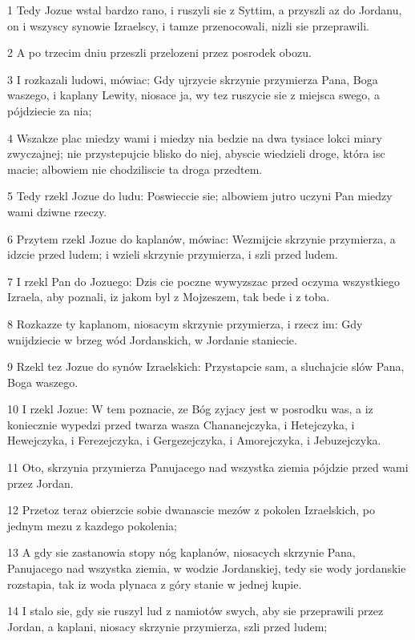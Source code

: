 \par 1 Tedy Jozue wstal bardzo rano, i ruszyli sie z Syttim, a przyszli az do Jordanu, on i wszyscy synowie Izraelscy, i tamze przenocowali, nizli sie przeprawili.
\par 2 A po trzecim dniu przeszli przelozeni przez posrodek obozu.
\par 3 I rozkazali ludowi, mówiac: Gdy ujrzycie skrzynie przymierza Pana, Boga waszego, i kaplany Lewity, niosace ja, wy tez ruszycie sie z miejsca swego, a pójdziecie za nia;
\par 4 Wszakze plac miedzy wami i miedzy nia bedzie na dwa tysiace lokci miary zwyczajnej; nie przystepujcie blisko do niej, abyscie wiedzieli droge, która isc macie; albowiem nie chodziliscie ta droga przedtem.
\par 5 Tedy rzekl Jozue do ludu: Poswieccie sie; albowiem jutro uczyni Pan miedzy wami dziwne rzeczy.
\par 6 Przytem rzekl Jozue do kaplanów, mówiac: Wezmijcie skrzynie przymierza, a idzcie przed ludem; i wzieli skrzynie przymierza, i szli przed ludem.
\par 7 I rzekl Pan do Jozuego: Dzis cie poczne wywyzszac przed oczyma wszystkiego Izraela, aby poznali, iz jakom byl z Mojzeszem, tak bede i z toba.
\par 8 Rozkazze ty kaplanom, niosacym skrzynie przymierza, i rzecz im: Gdy wnijdziecie w brzeg wód Jordanskich, w Jordanie staniecie.
\par 9 Rzekl tez Jozue do synów Izraelskich: Przystapcie sam, a sluchajcie slów Pana, Boga waszego.
\par 10 I rzekl Jozue: W tem poznacie, ze Bóg zyjacy jest w posrodku was, a iz koniecznie wypedzi przed twarza wasza Chananejczyka, i Hetejczyka, i Hewejczyka, i Ferezejczyka, i Gergezejczyka, i Amorejczyka, i Jebuzejczyka.
\par 11 Oto, skrzynia przymierza Panujacego nad wszystka ziemia pójdzie przed wami przez Jordan.
\par 12 Przetoz teraz obierzcie sobie dwanascie mezów z pokolen Izraelskich, po jednym mezu z kazdego pokolenia;
\par 13 A gdy sie zastanowia stopy nóg kaplanów, niosacych skrzynie Pana, Panujacego nad wszystka ziemia, w wodzie Jordanskiej, tedy sie wody jordanskie rozstapia, tak iz woda plynaca z góry stanie w jednej kupie.
\par 14 I stalo sie, gdy sie ruszyl lud z namiotów swych, aby sie przeprawili przez Jordan, a kaplani, niosacy skrzynie przymierza, szli przed ludem;
